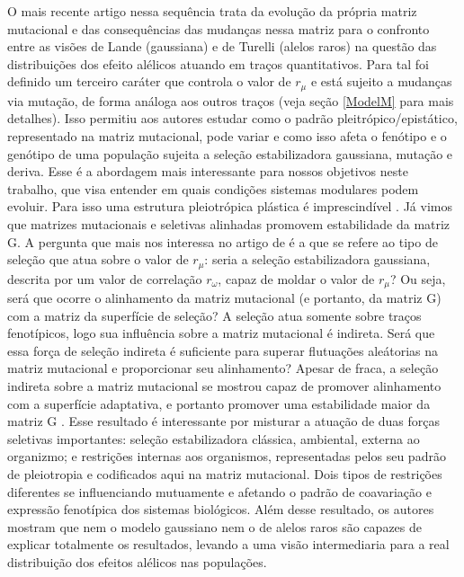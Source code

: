 \documentclass[a4paper, 12pt, titlepage, onecolumn]{article}
\numberwithin{equation}{section}
\numberwithin{table}{section}
\begin{document}
O mais recente artigo nessa sequência \citep{Jones2007} trata da
evolução da própria matriz mutacional e das consequências das mudanças
nessa matriz para o confronto entre as visões de Lande (gaussiana) e de
Turelli (alelos raros) na questão das distribuições dos efeito alélicos
atuando em traços quantitativos. Para tal foi definido um terceiro
caráter que controla o valor de $r_\mu$ e está sujeito a mudanças via
mutação, de forma análoga aos outros traços (veja seção \ref{ModelM} para
mais detalhes).  Isso permitiu aos autores estudar como o padrão
pleitrópico/epistático, representado na matriz mutacional, pode variar e
como isso afeta o fenótipo e o genótipo de uma população sujeita a
seleção estabilizadora gaussiana, mutação e deriva. Esse é a abordagem
mais interessante para nossos objetivos neste trabalho, que visa
entender em quais condições sistemas modulares podem evoluir. Para isso
uma estrutura pleiotrópica plástica é imprescindível \citep{Wagner1996,
Pavlicev2011a}. Já vimos que matrizes mutacionais e seletivas alinhadas
promovem estabilidade da matriz G. A pergunta que mais nos interessa
no artigo de \cite{Jones2007} é a que se refere ao tipo de seleção que atua sobre o valor
de $r_\mu$: seria a seleção estabilizadora gaussiana, descrita por um
valor de correlação $r_\omega$, capaz de moldar o valor de $r_\mu$? Ou
seja, será que ocorre o alinhamento da matriz mutacional (e portanto, da
matriz G)  com a matriz da superfície de seleção? A seleção atua somente
sobre traços fenotípicos, logo sua influência sobre a matriz mutacional
é indireta. Será que essa força de seleção indireta é suficiente para
superar flutuações aleátorias na matriz mutacional e proporcionar seu
alinhamento? Apesar de fraca, a seleção indireta sobre a matriz
mutacional se mostrou capaz de promover alinhamento com a superfície
adaptativa, e portanto promover uma estabilidade maior da matriz G
\citep{Jones2007}. Esse resultado é interessante por misturar a atuação
de duas forças seletivas importantes: seleção estabilizadora clássica,
ambiental, externa ao organizmo; e restrições internas aos organismos,
representadas pelos seu padrão de pleiotropia e codificados aqui na
matriz mutacional. Dois tipos de restrições diferentes se influenciando
mutuamente e afetando o padrão de coavariação e expressão fenotípica dos
sistemas biológicos. Além desse resultado, os autores mostram que nem o
modelo gaussiano nem o de alelos raros são capazes de explicar
totalmente os resultados, levando a uma visão intermediaria para a real
distribuição dos efeitos alélicos nas populações.
\end{document}

